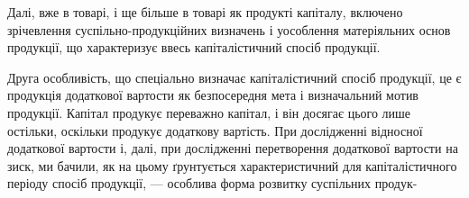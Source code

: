 Далі, вже в товарі, і ще більше в товарі як продукті капіталу, включено
зрічевлення суспільно-продукційних визначень і уособлення матеріяльних
основ продукції, що характеризує ввесь капіталістичний спосіб продукції.

Друга особливість, що спеціально визначає капіталістичний спосіб продукції,
це є продукція додаткової вартости як безпосередня мета і визначальний
мотив продукції. Капітал продукує переважно капітал, і він досягає цього
лише остільки, оскільки продукує додаткову вартість. При дослідженні відносної
додаткової вартости і, далі, при дослідженні перетворення додаткової вартости
на зиск, ми бачили, як на цьому ґрунтується характеристичний для капіталістичного
періоду спосіб продукції, — особлива форма розвитку суспільних продук-
\parbreak{}  %
